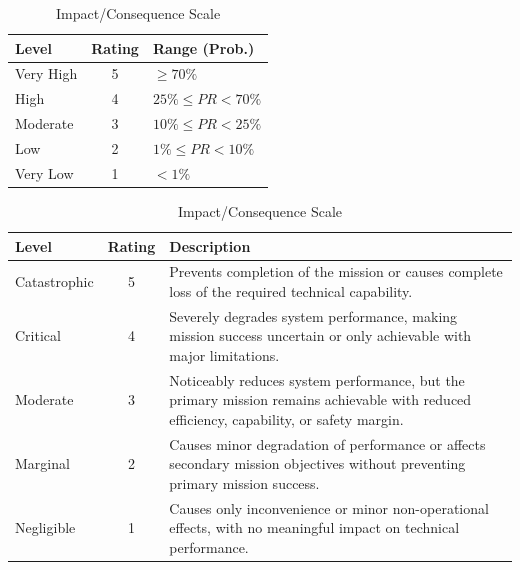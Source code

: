 \begin{table}[H]
    \centering
    \vspace{-5pt}
    \caption{Risk Assessment Scales: Probability and Impact 
    \cite{Hamann2006SystemsI}}
    \label{tab:risk_scales}
    
    \begin{minipage}{.36\textwidth}
        \centering
        \caption*{Probability Scale}
        \begin{tabular}{l c l}
            \toprule
            Level & Rating & Range (Prob.) \\
            \midrule
            Very High & 5 & $\ge 70\%$ \\
            High      & 4 & $25\% \le PR < 70\%$ \\
            Moderate  & 3 & $10\% \le PR < 25\%$ \\
            Low       & 2 & $1\% \le PR < 10\%$ \\
            Very Low  & 1 & $< 1\%$ \\
            \bottomrule
        \end{tabular}
    \end{minipage}
    \hfill 
    \begin{minipage}{.6\textwidth}
        \centering
        \vspace{-10pt}
        \caption*{Impact/Consequence Scale}
        \vspace{-5pt}
        \small
        \begin{tabularx}{\textwidth}{l c X}
            \toprule
            Level & Rating & Description \\
            \midrule
           Catastrophic & 5 & Prevents completion of the mission or causes complete loss of the required technical capability. \\

Critical & 4 & Severely degrades system performance, making mission success uncertain or only achievable with major limitations. \\

Moderate & 3 & Noticeably reduces system performance, but the primary mission remains achievable with reduced efficiency, capability, or safety margin. \\

Marginal & 2 & Causes minor degradation of performance or affects secondary mission objectives without preventing primary mission success. \\

Negligible & 1 & Causes only inconvenience or minor non-operational effects, with no meaningful impact on technical performance. \\
            \bottomrule
        \end{tabularx}
    \end{minipage}
\end{table}


